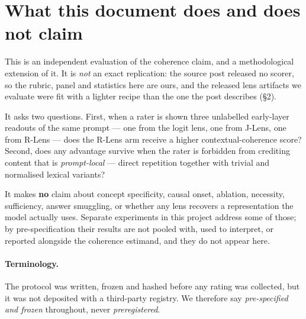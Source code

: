 \documentclass[11pt]{article}
\begin{document}
\begin{abstract}
The contribution is therefore neither a confirmation nor a refutation. R-Lens is
rated more coherent under a standard rubric, robustly and on both models. It also
receives more credit for prompt-local content --- which includes orthographic
normalisation such as \emph{poeple}\,$\to$\,\emph{people}, plausibly genuine
computation rather than copying. A post-hoc, rule-selected cell shows the two rubrics ranking
the same three arms in opposite orders. The token lists themselves make the
construct distinction visible; the numerical reversal that accompanies them
still depends on the instrument. We also show
that restricting to cells with equal observed echo --- the natural first response
to this confound --- gives a markedly more reassuring answer than rubric-based
exclusion, because it conditions on a variable the lens itself affects. Neither
method cleanly identifies the contribution of prompt-local content.
\end{abstract}

\section{What this document does and does not claim}

This is an independent evaluation of the coherence claim, and a methodological
extension of it. It is \emph{not} an exact replication: the source post released
no scorer, so the rubric, panel and statistics here are ours, and the released
lens artifacts we evaluate were fit with a lighter recipe than the one the post
describes (\S2).

It asks two questions. First, when a rater is shown three unlabelled
early-layer readouts of the same prompt --- one from the logit lens, one from
J-Lens, one from R-Lens --- does the R-Lens arm receive a higher
contextual-coherence score? Second, does any advantage survive when the rater is
forbidden from crediting content that is \emph{prompt-local} --- direct
repetition together with trivial and normalised lexical variants?

It makes \textbf{no} claim about concept specificity, causal onset, ablation,
necessity, sufficiency, answer smuggling, or whether any lens recovers a
representation the model actually uses. Separate experiments in this project
address some of those; by pre-specification their results are not pooled with,
used to interpret, or reported alongside the coherence estimand, and they do
not appear here.

\paragraph{Terminology.} The protocol was written, frozen and hashed before any
rating was collected, but it was not deposited with a third-party registry. We
therefore say \emph{pre-specified and frozen} throughout, never
\emph{preregistered}.
\end{document}
